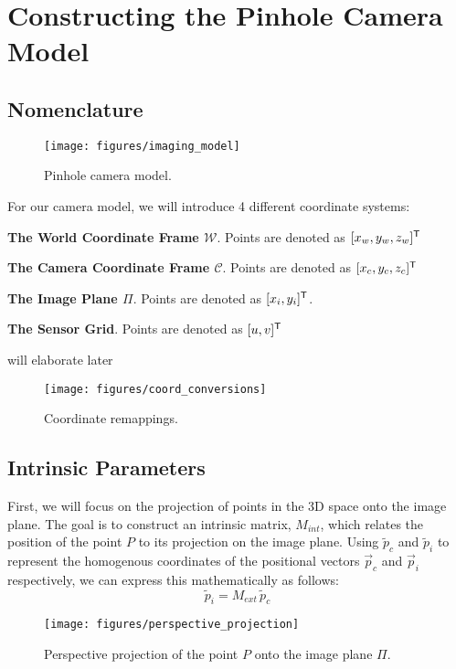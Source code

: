\section{Constructing the Pinhole Camera Model}

\subsection{Nomenclature}
\begin{figure}[H]
    \centering
    \texttt{[image: figures/imaging\_model]}
    \caption{Pinhole camera model.}
\end{figure}

For our camera model, we will introduce 4 different coordinate systems:

\textbf{The World Coordinate Frame $\mathcal{W}$}. Points are denoted as $[x_w, y_w, z_w]^{\mathsf{T}}$


\textbf{The Camera Coordinate Frame $\mathcal{C}$}. Points are denoted as $[x_c, y_c, z_c]^{\mathsf{T}}$

\textbf{The Image Plane $\Pi$}. Points are denoted as $[x_i, y_i]^{\mathsf{T}}$.

\textbf{The Sensor Grid}. Points are denoted as $[u, v]^{\mathsf{T}}$

will elaborate later

\begin{figure}[H]
    \centering
    \texttt{[image: figures/coord\_conversions]}
    \caption{Coordinate remappings.}
\end{figure}


\subsection{Intrinsic Parameters} \label{sec:intrinsics}

First, we will focus on the projection of points in the 3D space onto the image plane. The goal is to construct an intrinsic matrix, $M_{int}$, which relates the position of the point $P$ to its projection on the image plane. Using $\widetilde{p}_c$ and $\widetilde{p}_i$ to represent the homogenous coordinates of the positional vectors $\vec{p}_c$ and $\vec{p}_i$ respectively, we can express this mathematically as follows:
\begin{equation} \label{eq:pi}
    \widetilde{p}_i =  M_{ext}\,\widetilde{p}_c
\end{equation}

\begin{figure}[H]
    \centering
    \texttt{[image: figures/perspective\_projection]}
    \caption{Perspective projection of the point $P$ onto the image plane $\Pi$.}
\end{figure}

